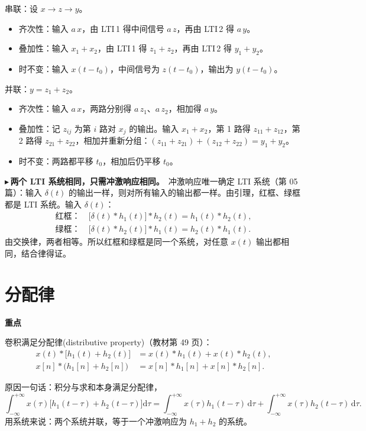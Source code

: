 \documentclass[UTF8,a4paper,11pt]{ctexart}
\newenvironment{remember}{\begin{rememberbox}\textbf{重点}\par\smallskip}{\end{rememberbox}}
\newcounter{ex}[section]
\newcommand{\point}[1]{\par\addvspace{1ex}\noindent\textcolor{ptteal}{$\blacktriangleright$\,\textbf{#1}}\ }
\begin{document}
串联：设 $x\to z\to y$。
\begin{itemize}[nosep]
\item 齐次性：输入 $a\,x$，由 LTI\,1 得中间信号 $a\,z$，再由 LTI\,2 得 $a\,y$。
\item 叠加性：输入 $x_1+x_2$，由 LTI\,1 得 $z_1+z_2$，再由 LTI\,2 得 $y_1+y_2$。
\item 时不变：输入 $x(t-t_0)$，中间信号为 $z(t-t_0)$，输出为 $y(t-t_0)$。
\end{itemize}
并联：$y=z_1+z_2$。
\begin{itemize}[nosep]
\item 齐次性：输入 $a\,x$，两路分别得 $a\,z_1$、$a\,z_2$，相加得 $a\,y$。
\item 叠加性：记 $z_{ij}$ 为第 $i$ 路对 $x_j$ 的输出。输入 $x_1+x_2$，第 1 路得 $z_{11}+z_{12}$，第 2 路得 $z_{21}+z_{22}$，相加并重新分组：$(z_{11}+z_{21})+(z_{12}+z_{22})=y_1+y_2$。
\item 时不变：两路都平移 $t_0$，相加后仍平移 $t_0$。
\end{itemize}

\point{两个 LTI 系统相同，只需冲激响应相同。}冲激响应唯一确定 LTI 系统（第 05 篇）：输入 $\delta(t)$ 的输出一样，则对所有输入的输出都一样。由引理，红框、绿框都是 LTI 系统。输入 $\delta(t)$：
\begin{align*}
\text{红框：}&\ \big[\delta(t)\ast h_1(t)\big]\ast h_2(t)=h_1(t)\ast h_2(t),\\
\text{绿框：}&\ \big[\delta(t)\ast h_2(t)\big]\ast h_1(t)=h_2(t)\ast h_1(t).
\end{align*}
由交换律，两者相等。所以红框和绿框是同一个系统，对任意 $x(t)$ 输出都相同，结合律得证。

\section{分配律}\label{sec:dist}
\begin{remember}
卷积满足分配律(distributive property)（教材第 49 页）：
\begin{align*}
x(t)\ast\big[h_1(t)+h_2(t)\big]&=x(t)\ast h_1(t)+x(t)\ast h_2(t),\\
x[n]\ast\big(h_1[n]+h_2[n]\big)&=x[n]\ast h_1[n]+x[n]\ast h_2[n].
\end{align*}
\end{remember}
原因一句话：积分与求和本身满足分配律，
\[
\int_{-\infty}^{+\infty}x(\tau)\big[h_1(t-\tau)+h_2(t-\tau)\big]\mathrm{d}\tau
=\int_{-\infty}^{+\infty}x(\tau)h_1(t-\tau)\,\mathrm{d}\tau+\int_{-\infty}^{+\infty}x(\tau)h_2(t-\tau)\,\mathrm{d}\tau .
\]
用系统来说：两个系统并联，等于一个冲激响应为 $h_1+h_2$ 的系统。
\end{document}
